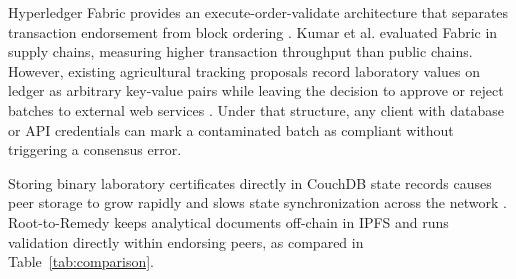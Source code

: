 \documentclass[conference]{IEEEtran}
\begin{document}
\begin{table}[htbp]
\caption{Comparative Matrix: Supply Chain Provenance Frameworks}
\label{tab:comparison}
\centering
{}
\end{table}

Hyperledger Fabric provides an execute-order-validate architecture that separates transaction endorsement from block ordering \cite{androulaki2018hyperledger}. Kumar et al. \cite{kumar2022hyperledger} evaluated Fabric in supply chains, measuring higher transaction throughput than public chains. However, existing agricultural tracking proposals record laboratory values on ledger as arbitrary key-value pairs while leaving the decision to approve or reject batches to external web services \cite{khatri2021herbal}. Under that structure, any client with database or API credentials can mark a contaminated batch as compliant without triggering a consensus error.

Storing binary laboratory certificates directly in CouchDB state records causes peer storage to grow rapidly and slows state synchronization across the network \cite{dwivedi2021decentralized}. Root-to-Remedy keeps analytical documents off-chain in IPFS and runs validation directly within endorsing peers, as compared in Table~\ref{tab:comparison}.
\end{document}
